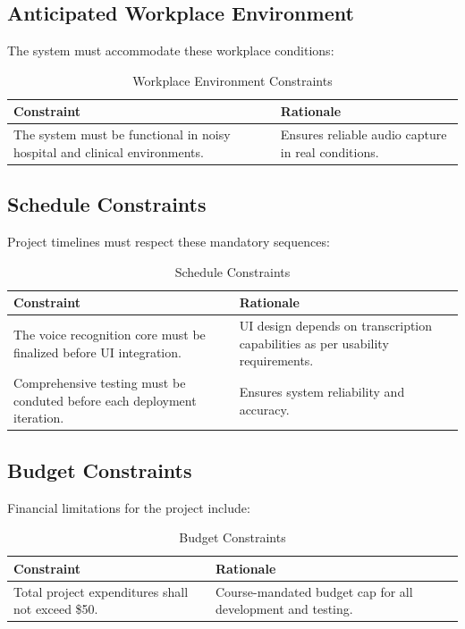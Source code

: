 \documentclass[12pt]{article}
\begin{document}
\subsection{Anticipated Workplace Environment}
The system must accommodate these workplace conditions:

\begin{table}[H]
\centering
\begin{tabular}{|p{6cm}|p{6cm}|}
\hline
\textbf{Constraint} & \textbf{Rationale} \\
\hline
The system must be functional in noisy hospital and clinical environments. & Ensures reliable audio capture in real conditions. \\
\hline
\end{tabular}
\caption{Workplace Environment Constraints}
\label{tab:workplace_constraints}
\end{table}

\subsection{Schedule Constraints}
Project timelines must respect these mandatory sequences:

\begin{table}[H]
\centering
\begin{tabular}{|p{6cm}|p{6cm}|}
\hline
\textbf{Constraint} & \textbf{Rationale} \\
\hline
The voice recognition core must be finalized before UI integration. & UI design depends on transcription capabilities as per usability requirements. \\
\hline
Comprehensive testing must be conduted before each deployment iteration. & Ensures system reliability and accuracy. \\
\hline
\end{tabular}
\caption{Schedule Constraints}
\label{tab:schedule_constraints}
\end{table}

\subsection{Budget Constraints}
Financial limitations for the project include:

\begin{table}[H]
\centering
\begin{tabular}{|p{6cm}|p{6cm}|}
\hline
\textbf{Constraint} & \textbf{Rationale} \\
\hline
Total project expenditures shall not exceed \$50. & Course-mandated budget cap for all development and testing. \\
\hline
\end{tabular}
\caption{Budget Constraints}
\label{tab:budget_constraints}
\end{table}
\end{document}
